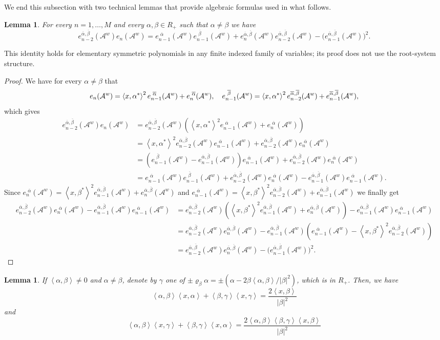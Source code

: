 \documentclass{article}
\numberwithin{equation}{section}
\newcommand{\Aa}{\mathcal{A}^{w}}
\newcommand{\xa}{\left<x,\alpha\right>}
\newcommand{\xb}{\left<x,\beta\right>}
\newcommand{\xc}{\left<x,\gamma\right>}
\newcommand{\xas}{\left<x,\alpha^*\right>}
\newcommand{\xbs}{\left<x,\beta^*\right>}
\newcommand{\ab}{\left<\alpha,\beta\right>}
\newcommand{\bc}{\left<\beta,\gamma\right>}
\newcommand{\reflect}[1]{\varrho_{#1}}
\newcommand{\shift}{\,\,}
\newcommand{\eA}[1]{e_{#1}(\Aa)}
\newcommand{\eaA}[1]{e_{#1}^{\shift\overline{\alpha}}(\Aa)}
\newcommand{\ebA}[1]{e_{#1}^{\shift\overline{\beta}}(\Aa)}
\newcommand{\eabA}[1]{e_{#1}^{\overline{\alpha}, \overline{\beta}}(\Aa)}
\theoremstyle{plain}
\newtheorem{lemma}[theorem]{Lemma}
\begin{document}
\bigskip

We end this subsection with two technical lemmas that provide algebraic formulas used in what follows. 

\begin{lemma}
For every $n = 1,\ldots, M$ and every $\alpha,\beta\in R_+$ such that $\alpha\neq \beta$ we have
\begin{equation}
	\label{eq:e:form2}
	\eabA{n-2}\eA{n} = \eaA{n-1}\ebA{n-1}+\eabA{n}\eabA{n-2}-\big(\eabA{n-1}\big)^2.
\end{equation}
\end{lemma}
This identity holds for elementary symmetric polynomials in any finite indexed family of variables; its proof does not use the root-system structure.

\begin{proof}
    We have for every $\alpha\neq \beta$ that
    \begin{equation*}
        \eA{n} = \xas^2 \eaA{n-1}+\eaA{n}\/,\quad \ebA{n-1} = \xas^2\eabA{n-2}+\eabA{n-1}\/,
    \end{equation*}
    which gives
    \begin{align*}
        \eabA{n-2}\eA{n} &= \eabA{n-2}\left( \xas^2 \eaA{n-1}+\eaA{n}\right)\\
        &=  \xas^2\eabA{n-2}\eaA{n-1}+\eabA{n-2}\eaA{n}\\
        &= \left(\ebA{n-1}-\eabA{n-1}\right)\eaA{n-1}+\eabA{n-2}\eaA{n}\\
        &= \eaA{n-1}\ebA{n-1}+\eabA{n-2}\eaA{n} - \eabA{n-1}\eaA{n-1}.
    \end{align*}
    Since $\eaA{n} = \xbs^2\eabA{n-1}+\eabA{n}$ and $\eaA{n-1} = \xbs^2\eabA{n-2}+\eabA{n-1}$ we finally get
    \begin{align*}
        \eabA{n-2}\eaA{n} - \eabA{n-1}\eaA{n-1} &= \eabA{n-2}\left(\xbs^2\eabA{n-1}+\eabA{n}\right)- \eabA{n-1}\eaA{n-1}\\
       &= \eabA{n-2}\eabA{n} - \eabA{n-1}\left(\eaA{n-1}-\xbs^2\eabA{n-2}\right)\\
       &= \eabA{n-2}\eabA{n}- \big( \eabA{n-1}\big)^2.
    \end{align*}

\end{proof}
\begin{lemma}
\label{prop:AP:alfagamma}
   If $\ab\neq 0$ and $\alpha\neq\beta$, denote by $\gamma$ one of $\pm\reflect{\beta}\alpha=\pm(\alpha-2\beta\ab/|\beta|^2)$, which is in $R_+$. Then, we have
	\begin{equation}
        \label{eq:ac:form1}
            \ab\xa+\bc\xc = \frac{2\xb}{|\beta|^2}
	\end{equation}
    and
    	\begin{equation}
        \label{eq:ac:form2}
            \ab\xc+\bc\xa = \frac{2\ab\bc\xb}{|\beta|^2}
	\end{equation}
\end{lemma}
\end{document}
